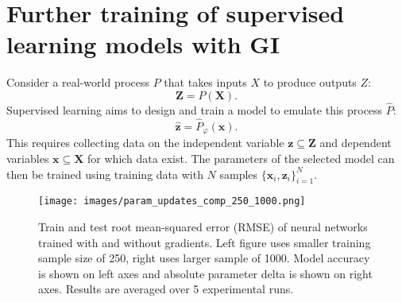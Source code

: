 \documentclass{article}
\begin{document}

\section{Further training of supervised learning models with GI}
\label{grads_NN_training}

Consider a real-world process $P$ that takes inputs $X$ to produce outputs $Z$:
\begin{equation}
\mathbf{Z} = P(\mathbf{X}).
\end{equation}
Supervised learning aims to design and train a model to emulate this process $\hat{P}$:
\begin{equation}
	\mathbf{\hat{z}} = \hat{P}_{\varphi}(\mathbf{x}).
\end{equation}
This requires collecting data on the independent variable $\mathbf{z}\subseteq \mathbf{Z}$ and dependent variables $\mathbf{x}\subseteq \mathbf{X}$ for which data exist. The parameters of the selected model can then be trained using training data with $N$ samples $\{\mathbf{x}_i, \mathbf{z}_i\}_{i=1}^N$.


\begin{figure*}[t]
	\centering
	\hbox{\hspace{-7.5em}\texttt{[image: images/param\_updates\_comp\_250\_1000.png]}}
	\caption{Train and test root mean-squared error (RMSE) of neural networks trained with and without gradients. Left figure uses smaller training sample size of 250, right uses larger sample of 1000. Model accuracy is shown on left axes and absolute parameter delta is shown on right axes. Results are averaged over 5 experimental runs.} 
	\label{tp_epochs}
\end{figure*}
\end{document}
